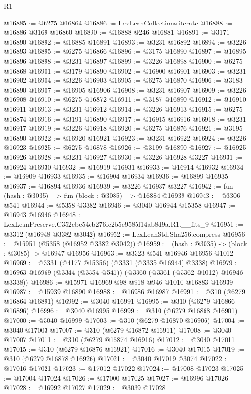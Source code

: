 \begin{lexlean}{R1}
\begin{coremodule}
@16885 := @6275 @16864
@16886 := LexLeanCollections.iterate
@16888 := @16886 @3169 @16860
@16890 := @16888 @246 @16881
@16891 := @3171 @16890
@16892 := @16885 @16891
@16893 := @3231 @16892
@16894 := @3226 @16893
@16895 := @6275 @16866
@16896 := @3175 @16890
@16897 := @16895 @16896
@16898 := @3231 @16897
@16899 := @3226 @16898
@16900 := @6275 @16868
@16901 := @3179 @16890
@16902 := @16900 @16901
@16903 := @3231 @16902
@16904 := @3226 @16903
@16905 := @6275 @16870
@16906 := @3183 @16890
@16907 := @16905 @16906
@16908 := @3231 @16907
@16909 := @3226 @16908
@16910 := @6275 @16872
@16911 := @3187 @16890
@16912 := @16910 @16911
@16913 := @3231 @16912
@16914 := @3226 @16913
@16915 := @6275 @16874
@16916 := @3191 @16890
@16917 := @16915 @16916
@16918 := @3231 @16917
@16919 := @3226 @16918
@16920 := @6275 @16876
@16921 := @3195 @16890
@16922 := @16920 @16921
@16923 := @3231 @16922
@16924 := @3226 @16923
@16925 := @6275 @16878
@16926 := @3199 @16890
@16927 := @16925 @16926
@16928 := @3231 @16927
@16930 := @3226 @16928 @3227
@16931 := @16924 @16930
@16932 := @16919 @16931
@16933 := @16914 @16932
@16934 := @16909 @16933
@16935 := @16904 @16934
@16936 := @16899 @16935
@16937 := @16894 @16936
@16939 := @3226 @16937 @3227
@16942 := fun (hash : @3035) => fun (block : @3085) => @16884 @16939
@16943 := @3306 @541
@16944 := @5358 @3382
@16946 := @3040 @16944 @15358
@16947 := @16943 @16946
@16948 := LexLeanPreserve.C352cbe54cb276fc2b5e9585f14ab8d9a.R1.__fits_9
@16951 := @3312 (@16948 @3382 @3042)
@16952 := LexLeanStd.Sha256.compress
@16956 := @16951 (@5358 (@16952 @3382 @3042))
@16959 := (hash : @3035) -> (block : @3085) -> @16947 @16956
@16963 := @3323 @541 @16946 @16956 @1012
@16969 := @3331 (@4177 @15356) (@3331 (@3335 @16944) @3338)
@16979 := @16963 @16969 (@3344 (@3354 @541)) (@3360 (@3361 (@3362 @1012) @16946 @3338))
@16986 := @15971 @16969 @98 @918 @946 @1010 @16883 @16939
@16987 := @15939 @16890
@16988 := @16986 @16987
@16991 := @310 (@6279 @16864 @16891)
@16992 := @3040 @16991
@16995 := @310 (@6279 @16866 @16896)
@16996 := @3040 @16995
@16999 := @310 (@6279 @16868 @16901)
@17000 := @3040 @16999
@17003 := @310 (@6279 @16870 @16906)
@17004 := @3040 @17003
@17007 := @310 (@6279 @16872 @16911)
@17008 := @3040 @17007
@17011 := @310 (@6279 @16874 @16916)
@17012 := @3040 @17011
@17015 := @310 (@6279 @16876 @16921)
@17016 := @3040 @17015
@17019 := @310 (@6279 @16878 @16926)
@17021 := @3040 @17019 @3074
@17022 := @17016 @17021
@17023 := @17012 @17022
@17024 := @17008 @17023
@17025 := @17004 @17024
@17026 := @17000 @17025
@17027 := @16996 @17026
@17028 := @16992 @17027
@17029 := @3039 @17028

\end{coremodule}
\end{lexlean}
